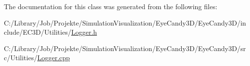 The documentation for this class was generated from the following files\+:\begin{DoxyCompactItemize}
\item 
C\+:/\+Library/\+Job/\+Projekte/\+Simulation\+Visualization/\+Eye\+Candy3\+D/\+Eye\+Candy3\+D/include/\+E\+C3\+D/\+Utilities/\mbox{\hyperlink{_logger_8h}{Logger.\+h}}\item 
C\+:/\+Library/\+Job/\+Projekte/\+Simulation\+Visualization/\+Eye\+Candy3\+D/\+Eye\+Candy3\+D/src/\+Utilities/\mbox{\hyperlink{_logger_8cpp}{Logger.\+cpp}}\end{DoxyCompactItemize}
